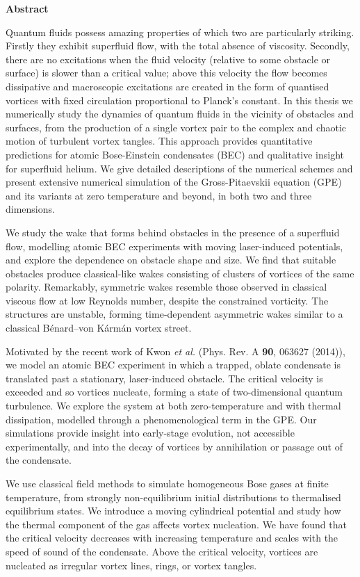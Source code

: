 \begin{center}
{\bf Abstract}
\end{center}
\noindent
Quantum fluids possess amazing properties of which two are particularly striking. Firstly they exhibit superfluid flow, with the total absence of viscosity. Secondly, there are no excitations when the fluid velocity (relative to some obstacle or surface) is slower than a critical value; above this velocity the flow becomes dissipative and macroscopic excitations are created in the form of quantised vortices with fixed circulation proportional to Planck's constant. In this thesis we numerically study the dynamics of quantum fluids in the vicinity of obstacles and surfaces, from the production of a single vortex pair to the complex and chaotic motion of turbulent vortex tangles. This approach provides quantitative predictions for atomic Bose-Einstein condensates (BEC) and qualitative insight for superfluid helium. We give detailed descriptions of the numerical schemes and present extensive numerical simulation of the Gross-Pitaevskii equation (GPE) and its variants at zero temperature and beyond, in both two and three dimensions.

We study the wake that forms behind obstacles in the presence of a superfluid flow, modelling atomic BEC experiments with moving laser-induced potentials, and explore the dependence on obstacle shape and size. We find that suitable obstacles produce classical-like wakes consisting of clusters of vortices of the same polarity. Remarkably, symmetric wakes resemble those observed in classical viscous flow at low Reynolds number, despite the constrained vorticity.  The structures are unstable, forming time-dependent asymmetric wakes similar to a classical B\'enard--von K\'arm\'an vortex street.

Motivated by the recent work of Kwon {\it et al.} (Phys. Rev. A {\bf 90}, 063627
(2014)), we model an atomic BEC experiment in which a trapped, oblate condensate is translated past a stationary, laser-induced obstacle. The critical velocity is exceeded and so vortices nucleate, forming a state of two-dimensional quantum turbulence. We explore the system at both zero-temperature and with thermal dissipation, modelled through a phenomenological term in the GPE. Our simulations provide insight into early-stage evolution, not accessible experimentally, and into the decay of vortices by annihilation or passage out of the condensate.

We use classical field methods to simulate homogeneous Bose gases at finite temperature, from strongly non-equilibrium initial distributions to thermalised equilibrium states. We introduce a moving cylindrical potential and study how the thermal component of the gas affects vortex nucleation. We have found that the critical velocity decreases with increasing temperature and scales with the speed of sound of the condensate. Above the critical velocity, vortices are nucleated as irregular vortex lines, rings, or vortex tangles.


